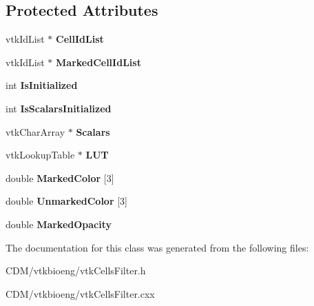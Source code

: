 \subsection*{Protected Attributes}
\begin{DoxyCompactItemize}
\item 
\hypertarget{classvtkCellsFilter_aee53307823447407c4f769c7077cf79b}{
vtkIdList $\ast$ {\bfseries CellIdList}}
\label{classvtkCellsFilter_aee53307823447407c4f769c7077cf79b}

\item 
\hypertarget{classvtkCellsFilter_ac986bfe15bbbaed420d2a8cd287b145c}{
vtkIdList $\ast$ {\bfseries MarkedCellIdList}}
\label{classvtkCellsFilter_ac986bfe15bbbaed420d2a8cd287b145c}

\item 
\hypertarget{classvtkCellsFilter_ae0c75f886e9bbb10eb8dc7b17274dd85}{
int {\bfseries IsInitialized}}
\label{classvtkCellsFilter_ae0c75f886e9bbb10eb8dc7b17274dd85}

\item 
\hypertarget{classvtkCellsFilter_aef2bc6acf60bb4770abb3e5e6506f8c2}{
int {\bfseries IsScalarsInitialized}}
\label{classvtkCellsFilter_aef2bc6acf60bb4770abb3e5e6506f8c2}

\item 
\hypertarget{classvtkCellsFilter_a41d0484bda42aed9f6f2ba642946bd56}{
vtkCharArray $\ast$ {\bfseries Scalars}}
\label{classvtkCellsFilter_a41d0484bda42aed9f6f2ba642946bd56}

\item 
\hypertarget{classvtkCellsFilter_a777995c83bd28f517172072b077b5c7d}{
vtkLookupTable $\ast$ {\bfseries LUT}}
\label{classvtkCellsFilter_a777995c83bd28f517172072b077b5c7d}

\item 
\hypertarget{classvtkCellsFilter_a0552526d1f7d4a59173a8a27fab9fba0}{
double {\bfseries MarkedColor} \mbox{[}3\mbox{]}}
\label{classvtkCellsFilter_a0552526d1f7d4a59173a8a27fab9fba0}

\item 
\hypertarget{classvtkCellsFilter_ad32dfbf5fdaa79198295f3e6fccc33fc}{
double {\bfseries UnmarkedColor} \mbox{[}3\mbox{]}}
\label{classvtkCellsFilter_ad32dfbf5fdaa79198295f3e6fccc33fc}

\item 
\hypertarget{classvtkCellsFilter_a2d7adb1c64e63226f4e9d089812f1be1}{
double {\bfseries MarkedOpacity}}
\label{classvtkCellsFilter_a2d7adb1c64e63226f4e9d089812f1be1}

\end{DoxyCompactItemize}


The documentation for this class was generated from the following files:\begin{DoxyCompactItemize}
\item 
CDM/vtkbioeng/vtkCellsFilter.h\item 
CDM/vtkbioeng/vtkCellsFilter.cxx\end{DoxyCompactItemize}
